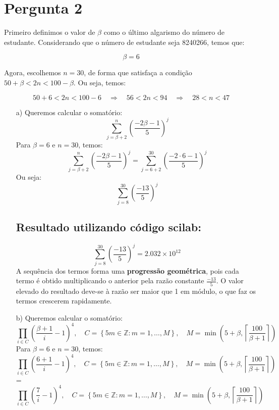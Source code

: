\chapter{Pergunta 2}

Primeiro definimos o valor de $\beta$ como o último algarismo do número de estudante. Considerando que o número de estudante seja 8240266, temos que:

\[
\beta = 6
\]

Agora, escolhemos $n = 30$, de forma que satisfaça a condição $50 + \beta < 2n < 100 - \beta$. Ou seja, temos:

\[
50 + 6 < 2n < 100 - 6 \quad \Rightarrow \quad 56 < 2n < 94 \quad \Rightarrow \quad 28 < n < 47
\]



\begin{enumerate}


    \item[a)]
    Queremos calcular o somatório:
    \[
    \sum_{j=\beta+2}^{n} \left( \frac{-2\beta-1}{5} \right)^j
    \]
    Para \(\beta = 6\) e \(n = 30\), temos:
    \[
    \sum_{j= \beta+2}^{n} \left( \frac{-2\beta-1}{5} \right)^j = \sum_{j= 6+2}^{30} \left( \frac{-2 \cdot 6 - 1}{5} \right)^j
    \]
    Ou seja:
    \[
    \sum_{j= 8}^{30} \left( \frac{-13}{5} \right)^j
    \]


\section*{Resultado utilizando  código scilab:}
     \[
    \sum_{j= 8}^{30} \left( \frac{-13}{5} \right)^j = 2.032 \times 10^{12}
    \]
A sequência dos termos forma uma \textbf{progressão geométrica}, pois cada termo é obtido multiplicando o anterior pela razão constante $\frac{-13}{5}$. O valor elevado do resultado deve-se à razão ser maior que 1 em módulo, o que faz os termos crescerem rapidamente.



   \item[b)]
   Queremos calcular o somatório:
   \[
\prod_{i \in C} \left( \frac{\beta + 1}{i } -1\right)^4, \quad C = \left\{ 5m \in \mathbb{Z}: m = 1, \dots, M \right\}, \quad M = \min \left( 5 + \beta, \left\lceil \frac{100}{\beta + 1} \right\rceil \right)
\]
    Para \(\beta = 6\) e \(n = 30\), temos:
     \[
\prod_{i \in C} \left( \frac{6 + 1}{i } -1\right)^4, \quad C = \left\{ 5m \in \mathbb{Z}: m = 1, \dots, M \right\}, \quad M = \min \left( 5 + \beta, \left\lceil \frac{100}{\beta + 1} \right\rceil \right) 
\]
 = \[
\prod_{i \in C} \left( \frac{7}{i }-1 \right)^4, \quad C = \left\{ 5m \in \mathbb{Z}: m = 1, \dots, M \right\}, \quad M = \min \left( 5 + \beta, \left\lceil \frac{100}{\beta + 1} \right\rceil \right) 
\]


\end{enumerate}
